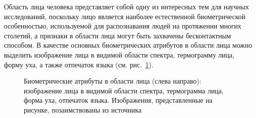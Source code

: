 \documentclass[12pt]{book}
\begin{document}
\large{Область лица человека представляет собой одну из интересных тем для научных исследований, поскольку лицо является наиболее естественной биометрической особенностью, используемой для распознавания людей на протяжении многих столетий, а признаки в области лица могут быть захвачены бесконтактным способом. В качестве основных биометрических атрибутов в области лица можно выделить изображение лица в видимой области спектра, термограмму лица, форму уха, а также отпечаток языка (см. рис.~\ref{fig:figure_1_3}).}

\begin{figure}[h]
\caption{Биометрические атрибуты в области лица (слева направо): изображение лица в видимой области спектра, термограмма лица, форма уха, отпечаток языка. Изображения, представленные на рисунке, позаимствованы из источника \cite{unar_2014}}
\label{fig:figure_1_3}
\end{figure}
\end{document}
